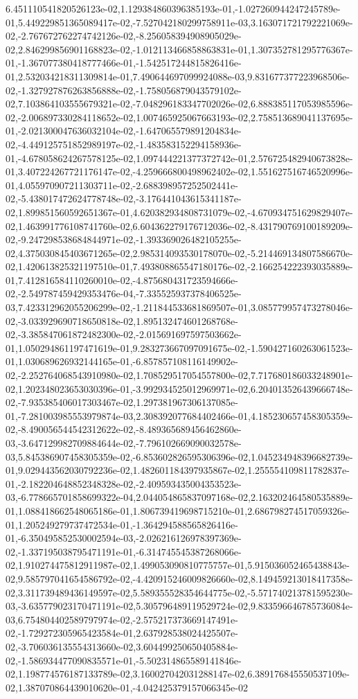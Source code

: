 6.451110541820526123e-02,1.129384860396385193e-01,-1.027260944247245789e-01,5.449229851365089417e-02,-7.527042180299758911e-03,3.163071721792221069e-02,-2.767672762274742126e-02,-8.256058394908905029e-02,2.846299856901168823e-02,-1.012113466858863831e-01,1.307352781295776367e-01,-1.367077380418777466e-01,-1.542517244815826416e-01,2.532034218311309814e-01,7.490644697099924088e-03,9.831677377223968506e-02,-1.327927876263856888e-02,-1.758056879043579102e-02,7.103864103555679321e-02,-7.048296183347702026e-02,6.888385117053985596e-02,-2.006897330284118652e-02,1.007465925067663193e-02,2.758513689041137695e-01,-2.021300047636032104e-02,-1.647065579891204834e-02,-4.449125751852989197e-02,-1.483583152294158936e-01,-4.678058624267578125e-02,1.097444221377372742e-01,2.576725482940673828e-01,3.407224267721176147e-02,-4.259666800498962402e-02,1.551627516746520996e-01,4.055970907211303711e-02,-2.688398957252502441e-02,-5.438017472624778748e-02,-3.176441043615341187e-02,1.899851560592651367e-01,4.620382934808731079e-02,-4.670934751629829407e-02,1.463991776108741760e-02,6.604362279176712036e-02,-8.431790769100189209e-02,-9.247298538684844971e-02,-1.393369026482105255e-02,4.375030845403671265e-02,2.985314093530178070e-02,-5.214469134807586670e-02,1.420613825321197510e-01,7.493808865547180176e-02,-2.166254222393035889e-01,7.412816584110260010e-02,-4.875680431723594666e-02,-2.549787459429353476e-04,-7.335525937378406525e-03,7.423312962055206299e-02,-1.211844533681869507e-01,3.085779957473278046e-02,-3.033929690718650818e-02,1.895132474601268768e-02,-3.385847061872482300e-02,-2.015691697597503662e-01,1.050294861197471619e-01,9.283273667097091675e-02,-1.590427160263061523e-01,1.030689626932144165e-01,-6.857857108116149902e-02,-2.252764068543910980e-02,1.708529517054557800e-02,7.717680186033248901e-02,1.202348023653030396e-01,-3.992934525012969971e-02,6.204013526439666748e-02,-7.935385406017303467e-02,1.297381967306137085e-01,-7.281003985553979874e-03,2.308392077684402466e-01,4.185230657458305359e-02,-8.490056544542312622e-02,-8.489365689456462860e-03,-3.647129982709884644e-02,-7.796102669090032578e-03,5.845386907458305359e-02,-6.853602826595306396e-02,1.045234948396682739e-01,9.029443562030792236e-02,1.482601184397935867e-02,1.255554109811782837e-01,-2.182204648852348328e-02,-2.409593435004353523e-03,-6.778665701858699322e-04,2.044054865837097168e-02,2.163202464580535889e-01,1.088418662548065186e-01,1.806739419698715210e-01,2.686798274517059326e-01,1.205249279737472534e-01,-1.364294588565826416e-01,-6.350495852530002594e-03,-2.026216126978397369e-02,-1.337195038795471191e-01,-6.314745545387268066e-02,1.910274475812911987e-02,1.499053090810775757e-01,5.915036052465438843e-02,9.585797041654586792e-02,-4.420915246009826660e-02,8.149459213018417358e-02,3.311739489436149597e-02,5.589355528354644775e-02,-5.571740213781595230e-03,-3.635779023170471191e-02,5.305796489119529724e-02,9.833596646785736084e-03,6.754804402589797974e-02,-2.575217373669147491e-02,-1.729272305965423584e-01,2.637928538024425507e-02,-3.706036135554313660e-02,3.604499250650405884e-02,-1.586934477090835571e-01,-5.502314865589141846e-02,1.198774576187133789e-02,3.160027042031288147e-02,6.389176845550537109e-02,1.387070864439010620e-01,-4.042425379157066345e-02
